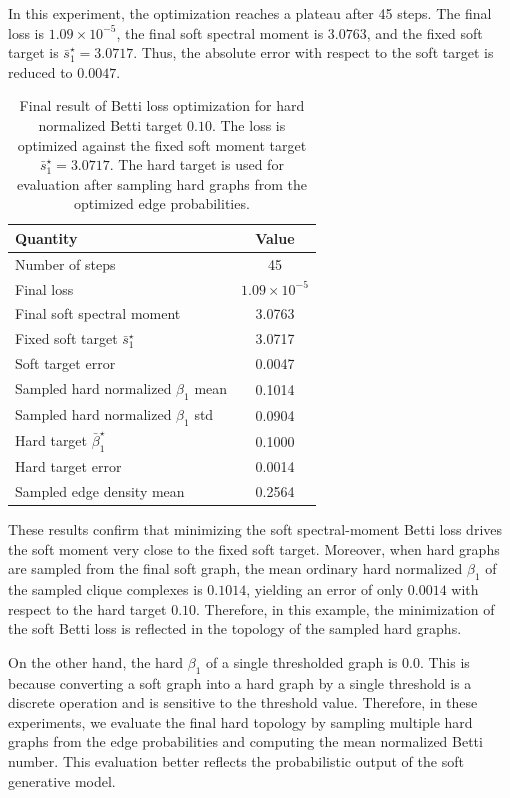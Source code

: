 \documentclass[pdflatex,sn-mathphys-ay]{sn-jnl}%
\theoremstyle{thmstyleone}%
\theoremstyle{thmstyletwo}%
\theoremstyle{thmstylethree}%
\begin{document}
In this experiment, the optimization reaches a plateau after 45 steps. The final loss is \(1.09 \times 10^{-5}\), the final soft spectral moment is \(3.0763\), and the fixed soft target is \(\bar{s}_1^\star=3.0717\). Thus, the absolute error with respect to the soft target is reduced to \(0.0047\).

\begin{table}[t]
    \centering
    \caption{Final result of Betti loss optimization for hard normalized Betti target \(0.10\). The loss is optimized against the fixed soft moment target \(\bar{s}_1^\star=3.0717\). The hard target is used for evaluation after sampling hard graphs from the optimized edge probabilities.}
    \label{tab:betti_optimization}
    \begin{tabular}{l|c}
        \hline
        Quantity & Value \\
        \hline
        Number of steps & 45 \\
        Final loss & $1.09 \times 10^{-5}$ \\
        Final soft spectral moment & 3.0763 \\
        Fixed soft target \(\bar{s}_1^\star\) & 3.0717 \\
        Soft target error & 0.0047 \\
        Sampled hard normalized \(\beta_1\) mean & 0.1014 \\
        Sampled hard normalized \(\beta_1\) std & 0.0904 \\
        Hard target \(\bar{\beta}_1^\star\) & 0.1000 \\
        Hard target error & 0.0014 \\
        Sampled edge density mean & 0.2564 \\
        \hline
    \end{tabular}
\end{table}

These results confirm that minimizing the soft spectral-moment Betti loss drives the soft moment very close to the fixed soft target. Moreover, when hard graphs are sampled from the final soft graph, the mean ordinary hard normalized \(\beta_1\) of the sampled clique complexes is \(0.1014\), yielding an error of only \(0.0014\) with respect to the hard target \(0.10\). Therefore, in this example, the minimization of the soft Betti loss is reflected in the topology of the sampled hard graphs.

On the other hand, the hard $\beta_1$ of a single thresholded graph is $0.0$. This is because converting a soft graph into a hard graph by a single threshold is a discrete operation and is sensitive to the threshold value. Therefore, in these experiments, we evaluate the final hard topology by sampling multiple hard graphs from the edge probabilities and computing the mean normalized Betti number. This evaluation better reflects the probabilistic output of the soft generative model.
\end{document}

